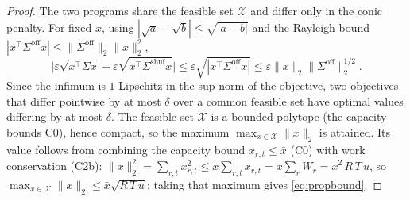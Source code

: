 \documentclass[12pt]{article}
\begin{document}
\begin{proof}
The two programs share the feasible set $\mathcal X$ and differ only in the conic
penalty. For fixed $x$, using $|\sqrt a-\sqrt b|\le\sqrt{|a-b|}$ and the Rayleigh
bound $|x^\top\Sigma^{\mathrm{off}}x|\le\lVert\Sigma^{\mathrm{off}}\rVert_2\lVert
x\rVert_2^2$,
\[
\big|\varepsilon\sqrt{x^\top\Sigma x}-\varepsilon\sqrt{x^\top\Sigma^{\mathrm{shuf}}x}\big|
\le\varepsilon\sqrt{|x^\top\Sigma^{\mathrm{off}}x|}
\le\varepsilon\lVert x\rVert_2\lVert\Sigma^{\mathrm{off}}\rVert_2^{1/2}.
\]
Since the infimum is $1$-Lipschitz in the sup-norm of the objective, two objectives
that differ pointwise by at most $\delta$ over a common feasible set have optimal
values differing by at most $\delta$. The feasible set $\mathcal X$ is a bounded
polytope (the capacity bounds C0), hence compact, so the maximum
$\max_{x\in\mathcal X}\lVert x\rVert_2$ is attained. Its value follows from combining
the capacity bound $x_{r,t}\le\bar x$ (C0) with work conservation (C2b):
$\lVert x\rVert_2^2=\sum_{r,t}x_{r,t}^2\le\bar x\sum_{r,t}x_{r,t}=\bar x\sum_r W_r
=\bar x^2\,R\,T\,u$, so $\max_{x\in\mathcal X}\lVert x\rVert_2\le\bar x\sqrt{R\,T\,u}$;
taking that maximum gives \eqref{eq:propbound}.
\end{proof}
\end{document}
